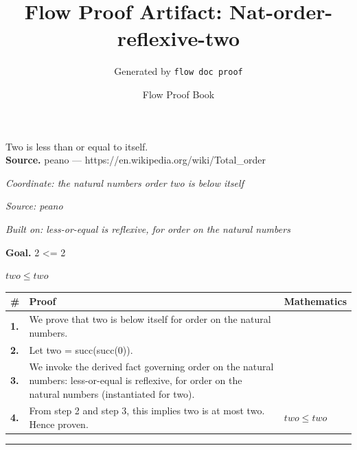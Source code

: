 \documentclass[11pt]{article}
\title{Flow Proof Artifact: Nat-order-reflexive-two}
\author{Generated by \texttt{flow doc proof}}
\date{Flow Proof Book}
\theoremstyle{definition}
\begin{document}
\maketitle
Two is less than or equal to itself.\\[0.5em]
\textbf{Source.} peano — https://en.wikipedia.org/wiki/Total\_order\\[0.5em]
\bigskip
{}\par
\smallskip\noindent\textit{Coordinate: the natural numbers \cdot order \cdot two is below itself}\par
\smallskip\noindent\textit{Source: peano}\par
\smallskip\noindent\textit{Built on: less-or-equal is reflexive, for order on the natural numbers}\par
\medskip
\noindent\textbf{Goal.} 2 <= 2\par
\noindent$\displaystyle two \le two$\par
\medskip
\noindent
\begin{tabular}{@{} >{\raggedright\arraybackslash}p{} >{\raggedright\arraybackslash}p{} >{\raggedleft\arraybackslash}p{} @{}}
\textbf{\#} & \textbf{Proof} & \textbf{Mathematics} \\
\midrule
\textbf{1.} & We prove that two is below itself for order on the natural numbers. & \\[0.45em]
\textbf{2.} & Let two = succ(succ(0)). & \\[0.45em]
\textbf{3.} & We invoke the derived fact governing order on the natural numbers: less-or-equal is reflexive, for order on the natural numbers (instantiated for two). & \\[0.45em]
\textbf{4.} & From step 2 and step 3, this implies two is at most two. Hence proven. & $\displaystyle two \le two$ \\[0.45em]
\bottomrule
\end{tabular}
\label{thm:Nat-order-two_is_below_itself}
\par\medskip\hrule
\end{document}
